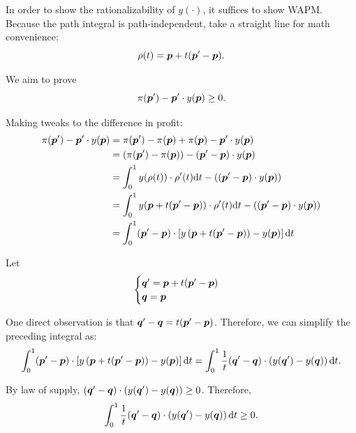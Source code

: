 {\begin{itemize}
  In order to show the rationalizability of \(y(\cdot)\), it suffices to
  show WAPM. Because the path integral is path-independent, take a straight line for math convenience:
  \[\rho(t) = \bm p+t(\bm p'-\bm p).\]

    We aim to prove
  \[\pi(\bm p') - \bm p'\cdot y(\bm p)\ge 0.\]

  Making tweaks to the difference in profit:
  $$
\begin{aligned}
  \pi(\bm p')-\bm p'\cdot y(\bm p) & = \pi(\bm p')-\pi(\bm p) + \pi(\bm p)-\bm p'\cdot y(\bm p)\\
  & = \left(\pi(\bm p')-\pi(\bm p) \right) - (\bm p'-\bm p)\cdot y(\bm p)\\
  &= \int_0^1 y(\rho(t))\cdot \rho'(t)\text{d}t -\left((\bm p'-\bm p)\cdot y(\bm p) \right)\\
  &= \int_0^1 y(\bm p+t(\bm p'-\bm p))\cdot \rho'(t)\text{d}t -\left((\bm p'-\bm p)\cdot y(\bm p) \right)\\
  & = \int_0^1 (\bm p'-\bm p)\cdot \left[y\left(\bm p+t(\bm p'-\bm p)\right) -y(\bm p) \right]\text{d}t
  \end{aligned}
$$

  Let
  $$
\begin{cases}
  \bm q' = \bm p+t(\bm p'-\bm p)\\
  \bm q = \bm p
  \end{cases}
$$

  One direct observation is that \(\bm q'-\bm q = t(\bm p'-\bm p)\). Therefore, we
  can simplify the preceding integral as:
  \[\int_0^1 (\bm p'-\bm p)\cdot \left[y\left(\bm p+t(\bm p'-\bm p)\right) -y(\bm p) \right]\text{d}t = \int_0^1 \frac1t (\bm q'-\bm q)\cdot \left(y(\bm q')-y(\bm q) \right) \text{d}t.\]

  By law of supply,
  \((\bm q'-\bm q)\cdot \left(y(\bm q')-y(\bm q) \right)\ge 0\). Therefore,
  \[\int_0^1 \frac1t(\bm q'-\bm q)\cdot \left(y(\bm q')-y(\bm q) \right) \text{d}t\ge 0.\]
\end{itemize}
}

